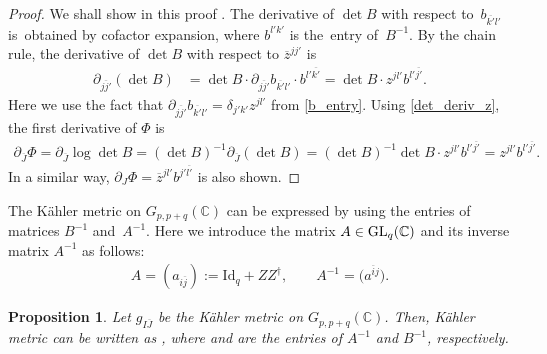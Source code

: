 \documentclass[pdftex]{sigma}
\numberwithin{equation}{section}
\newtheorem{Proposition}[Theorem]{Proposition}
 { \theoremstyle{definition}
\newtheorem{Definition}[Theorem]{Definition}
\newtheorem{Note}[Theorem]{Note}
\newtheorem{Example}[Theorem]{Example}
\newtheorem{Remark}[Theorem]{Remark} }
\begin{document}
\begin{proof}
We shall
show
in this proof
.
The derivative of
$
\det
B
$
with respect to~$b_{\overline{k'}l'}$ is~obtained
by cofactor expansion, where $b^{l'k'}$ is the~entry of~$B^{-1}$.
By the chain rule, the derivative of
$
\det
B
$
with respect to $\overline{z}^{jj'}$ is
\begin{align}
 \partial_{\overline{jj'}}
 (
 \det
 B
 )
 &=
 \det
 B
 \cdot
 \partial_{\overline{jj'}}
 b_{\overline{k'}l'}
 \cdot
 b^{l'\overline{k'}}
=
 \det
 B
 \cdot
 z^{jl'}
 b^{l'\overline{j'}}.
 \label{det_deriv_z}
\end{align}
Here we use the fact that
$
\partial_{\overline{jj'}}
b_{\overline{k'}l'}
=
\delta_{j'
k'
}
z^{jl'}
$
from \eqref{b_entry}.
Using \eqref{det_deriv_z}, the first derivative of $\Phi$ is
\begin{align*}
 \partial_{\overline{J}}
 \Phi
 =
 \partial_{\overline{J}}
 \log
 \det
 B
 =
 (
 \det
 B
 )^{-1}
 \partial_{\overline{J}}
 (
 \det
 B
 )
 =
 (
 \det
 B
 )^{-1}
 \det
 B
 \cdot
 {z}^{jl'}
 b^{l'\overline{j'}}
 =
 z^{jl'}
 b^{l'\overline{j'}}.
\end{align*}
In a similar way,
$
 \partial_{J}
 \Phi
 =
 \overline{z}^{jl'}
 b^{j'\overline{l'}}
$
is also shown.%
\end{proof}


The K\"ahler metric
on
$G_{p,p+q}(\mathbb{C})$ can be expressed by using the entries of matrices $B^{-1}$ and~$
 A^{-1}
$. Here we introduce the matrix
$
 A
 \in
 {\rm GL}_{q}
 (\mathbb{C})
$
and its inverse matrix $A^{-1}$ as follows:
\begin{align*}
 A
 =
 (
 a_{i\overline{j}}
 )
 :=
 \mathrm{Id}_{q}
 +
 Z
 Z^{\dagger},
 \qquad
 A^{-1}
 =
 \bigl(
 a^{\overline{i}j}
 \bigr).
\end{align*}

\begin{Proposition}\label{thm_metric_mtx}
Let $g_{I\overline{J}}$ be the K\"ahler metric
on $G_{p,p+q}(\mathbb{C})$. Then, K\"ahler metric
can be written as
,
where  and  are the entries of
$
 A^{-1}
$
and
$
 B^{-1}
$,
respectively.
\end{Proposition}
\end{document}
